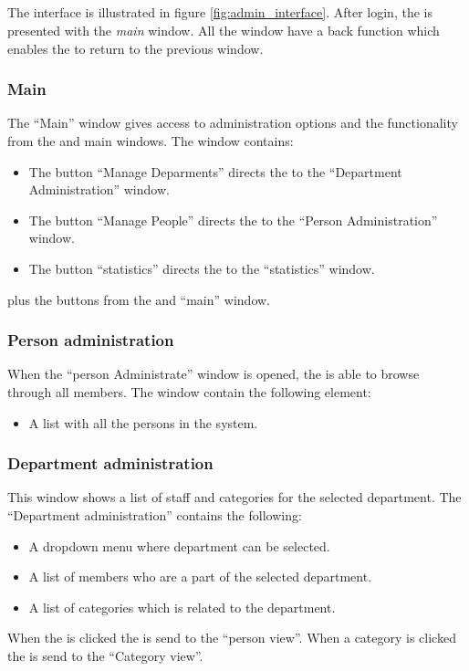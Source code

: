 \subsection{\ainterface}
\label{sec:admininterface}
The \admin[] interface is illustrated in figure \ref{fig:admin_interface}.
After login, the \admin[] is presented with the \textit{main} window. All the window have a back function which enables the \admin[] to return to the previous window.

\subsubsection{Main}
The ``Main'' \admin window gives access to administration options and the functionality from the \astaff and \aclient main windows. The window contains: 
\begin{itemize}
	\item The button ``Manage Deparments'' directs the \admin[] to the ``Department Administration'' window.  
	\item The button ``Manage People'' directs the \admin[] to the ``Person Administration'' window.
	\item The button ``statistics'' directs the \admin[] to the ``statistics'' window.
\end{itemize}
plus the buttons from the \astaff[] and \aclient[] ``main'' window.

\subsubsection{Person administration}
When the ``person Administrate'' window is opened, the \admin is able to browse through all \astaff members. The window contain the following element:
\begin{itemize}
	\item A list with all the persons in the system.
\end{itemize}

\subsubsection{Department administration}
This window shows a list of staff and categories for the selected department.
The ``Department administration'' contains the following:
\begin{itemize}
	\item A dropdown menu where department can be selected.
	\item A list of \astaff[] members who are a part of the selected department.
	\item A list of categories which is related to the department.
\end{itemize}
When the \astaff[] is clicked the \admin[] is send to the ``person view''.
When a category is clicked the \admin[] is send to the ``Category view''. 


